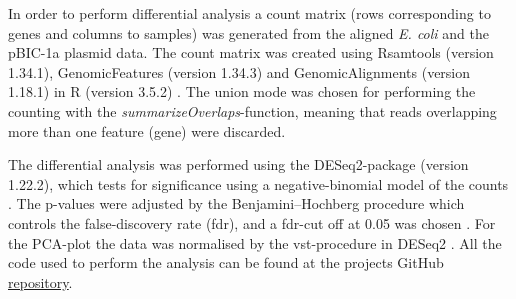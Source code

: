 In order to perform differential analysis a count matrix (rows corresponding to genes and columns to samples) was generated from the aligned \textit{E. coli} and the pBIC-1a plasmid data. The count matrix was created using Rsamtools (version 1.34.1), GenomicFeatures (version 1.34.3) and GenomicAlignments (version 1.18.1) in R (version 3.5.2) \cite{lawrence2013software_gen_align, morgan2016rsamtools}. The union mode was chosen for performing the counting with the \textit{summarizeOverlaps}-function, meaning that reads overlapping more than one feature (gene) were discarded. 

The differential analysis was performed using the DESeq2-package (version 1.22.2), which tests for significance using a negative-binomial model of the counts \cite{love2014moderated_DESeq2}. The p-values were adjusted by the Benjamini–Hochberg procedure which controls the false-discovery rate (fdr), and a fdr-cut off at 0.05 was chosen \cite{benjamini}. For the PCA-plot the data was normalised by the vst-procedure in DESeq2 \cite{love2014moderated_DESeq2}. All the code used to perform the analysis can be found at the projects GitHub \href{https://github.com/sebapersson/Project_BBT015}{\color{MidnightBlue} \underline{repository}}. 